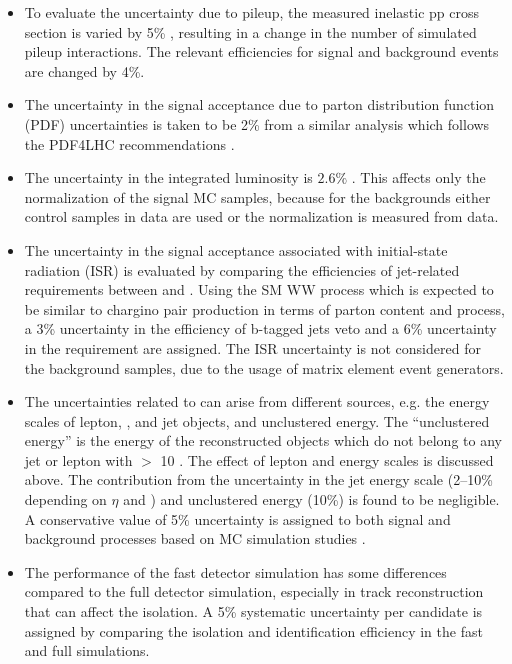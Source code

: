 \begin{itemize}
\item To evaluate the uncertainty due to pileup, the measured inelastic pp cross section is
  varied by 5\% \cite{Antchev:2011vs}, resulting in a change in the number of simulated pileup interactions.
 The relevant efficiencies for signal and background events are changed by 4\%.

\item The uncertainty in the signal acceptance due to parton distribution function (PDF) uncertainties 
  is taken to be 2\% from a similar analysis \cite{Khachatryan:2014qwa} which follows the PDF4LHC recommendations \cite{pdf4lhc}.

\item The uncertainty in the integrated luminosity  is $2.6\%$ \cite{CMS-PAS-LUM-13-001}.  This affects only the
  normalization of the signal MC samples, because for the backgrounds  either control samples in data are used or the normalization is measured from data.

\item The uncertainty in the signal acceptance associated with initial-state radiation (ISR)
is evaluated by comparing the efficiencies of jet-related requirements between \PYTHIA
 and \MADGRAPH. Using the SM WW process which
 is expected to be similar to chargino pair production in terms of parton content and process, a 3\% uncertainty in 
the efficiency of  b-tagged jets veto and a 6\% uncertainty in the \deltaphi requirement are assigned. The ISR
 uncertainty is not considered for the background samples, due to the usage of matrix element event generators.

\item The uncertainties related to \MPT can arise from different sources, e.g.  the energy scales of lepton, \Tau, and jet 
objects, and unclustered energy.  The ``unclustered energy'' is the energy of the reconstructed objects which
 do not belong to any jet or lepton with \PT $>$ 10 \GeV. The effect of lepton and \Tau
 energy scales is discussed above. The contribution from the uncertainty in the jet energy scale (2--10\% depending on $\eta$  and \PT) and
 unclustered energy (10\%) is found to be negligible. A conservative value of 5\% uncertainty
 is assigned to both signal and background processes based on MC simulation studies \cite{Khachatryan:2015kxa, Khachatryan:2014qwa}.

\item The performance of the fast detector simulation has some differences compared to the full detector simulation, especially in
 track reconstruction \cite{Khachatryan:2015kxa} that can affect the \Tau isolation. A 5\% systematic uncertainty per
 \Tau candidate is assigned by comparing the \Tau isolation and identification efficiency in the fast
 and full simulations. 



\end{itemize}
